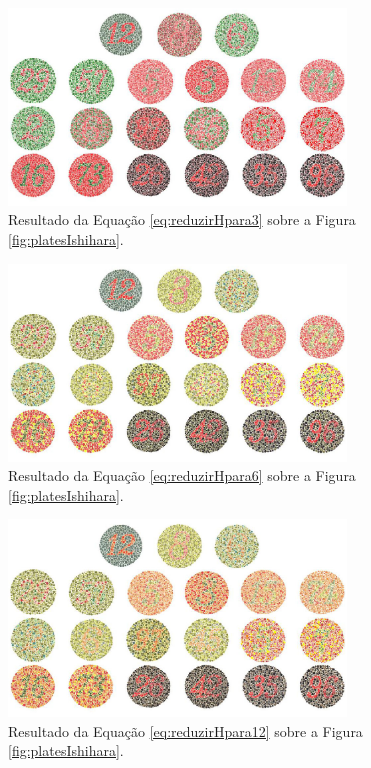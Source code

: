 \documentclass[	12pt, Times, openright, twoside, a4paper, english, brazil]{abntex2}
\begin{document}
\begin{figure}[!htb]
\centering \includegraphics[width=0.80\textwidth]{figuraDeslocarH3.jpg}
\caption{Resultado da Equação \ref{eq:reduzirHpara3} sobre a Figura \ref{fig:platesIshihara}. \label{fig:reduzirHpara3}}
\end{figure}

\begin{figure}[!htb]
\centering \includegraphics[width=0.80\textwidth]{figuraDeslocarH6.jpg}
\caption{Resultado da Equação \ref{eq:reduzirHpara6} sobre a Figura \ref{fig:platesIshihara}. \label{fig:reduzirHpara6}}
\end{figure}

\begin{figure}[!htb]
\centering \includegraphics[width=0.80\textwidth]{figuraDeslocarH12.jpg}
\caption{Resultado da Equação \ref{eq:reduzirHpara12} sobre a Figura \ref{fig:platesIshihara}. \label{fig:reduzirHpara12}}
\end{figure}
\end{document}

